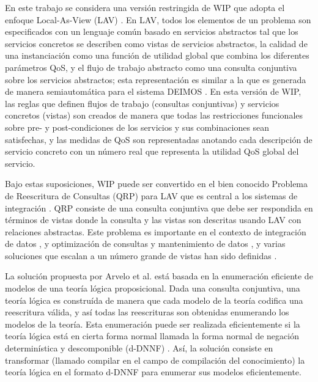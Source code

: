 En este trabajo se considera una versión restringida de WIP que adopta el
enfoque Local-As-View (LAV) \cite{levy:bucket}. En LAV, todos los elementos de un
problema son especificados con un lenguaje común basado en servicios abstractos
tal que los servicios concretos se describen como vistas de servicios
abstractos, la calidad de una instanciación como una función de utilidad global
que combina los diferentes parámetros QoS, y el flujo de trabajo abstracto como
una consulta conjuntiva sobre los servicios abstractos; esta representación es
similar a la que es generada de manera semiautomática para el sistema DEIMOS
\cite{AmbiteISWC09}. En esta versión de WIP, las reglas que definen flujos de trabajo
(consultas conjuntivas) y servicios concretos (vistas) son creados de manera que
todas las restricciones funcionales sobre pre- y post-condiciones de los
servicios y sus combinaciones sean satisfechas, y las medidas de QoS son
representadas anotando cada descripción de servicio concreto con un número real
que representa la utilidad QoS global del servicio.

Bajo estas suposiciones, WIP puede ser convertido en el bien conocido Problema
de Reescritura de Consultas (QRP) para LAV que es central a los sistemas de
integración \cite{halevy:survey}. QRP consiste de una consulta conjuntiva que debe ser
respondida en términos de vistas donde la consulta y las vistas son descritas
usando LAV con relaciones abstractas. Este problema es importante en el contexto
de integración de datos \cite{Chen05,JaudoinPRST05}, y optimización de consultas y mantenimiento
de datos \cite{AfratiLU07,levy:bucket}, y varias soluciones que escalan a un número grande de
vistas han sido definidas \cite{arvelo:aaai06,pods:DuschkaG97,sac:DuschkaG97,levy:bucket,pottinger:minicon}.

La solución propuesta por Arvelo et al. \cite{arvelo:aaai06} está basada en la enumeración
eficiente de modelos de una teoría lógica proposicional. Dada una consulta conjuntiva, una teoría
lógica es construída de manera que cada modelo de la teoría codifica una
reescritura válida, y así todas las reescrituras son obtenidas enumerando los
modelos de la teoría. Esta enumeración puede ser realizada eficientemente si la
teoría lógica está en cierta forma normal llamada la forma normal de negación
determinística y descomponible (d-DNNF) \cite{darwiche:d-dnnfs}. Así,
la solución consiste en transformar (llamado compilar en el campo de
compilación del conocimiento) la teoría lógica en el formato d-DNNF para
enumerar sus modelos eficientemente.

